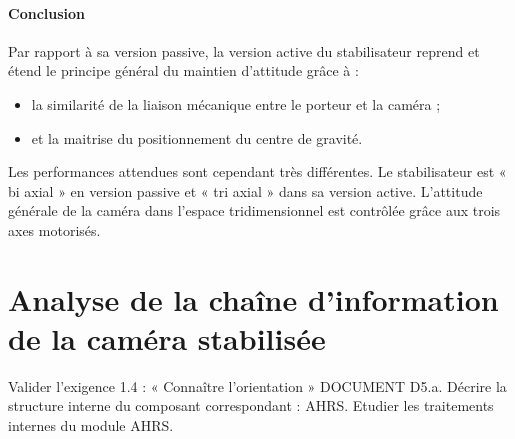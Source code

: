 \documentclass[10pt,fleqn]{article} %
\begin{document}
% 
%

\paragraph*{Conclusion}
Par rapport à sa version passive, la version active du stabilisateur reprend et étend le principe général du maintien d'attitude grâce à :
\begin{itemize}
\item la similarité de la liaison mécanique entre le porteur et la caméra ; 
\item et la maitrise du positionnement du centre de gravité. 
\end{itemize}
Les performances attendues sont cependant très différentes. Le stabilisateur est « bi axial » en  version  passive  et  « tri axial » dans sa version active. L’attitude générale de la caméra dans l’espace tridimensionnel est contrôlée grâce aux trois axes motorisés.

\section{Analyse de la chaîne d’information de la caméra stabilisée}

\begin{obj}
Valider l’exigence 1.4 : « Connaître l’orientation » DOCUMENT D5.a. Décrire la structure interne du composant correspondant : AHRS. Etudier les traitements internes du module AHRS.
\end{obj}
\end{document}
